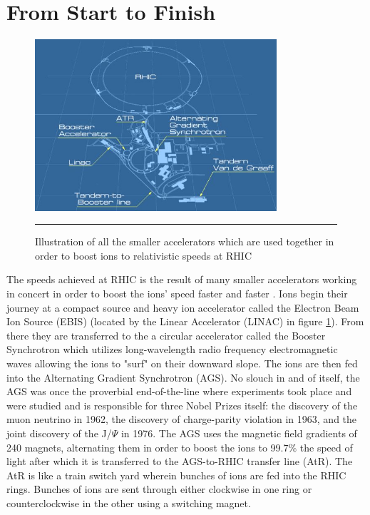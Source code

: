 \section{From Start to Finish}
\begin{figure}[htbp]
  \centering
    \includegraphics[width=0.8\textwidth]{Figures/RHICdiagram.JPG}
    \rule{35em}{0.5pt}
  \caption[Illustration of all the accelerators used to boost ions to relativistic speeds at RHIC]{Illustration of all the smaller accelerators which are used together in order to boost ions to relativistic speeds at RHIC}
  \label{fig:RHICdiagram}
\end{figure}
The speeds achieved at RHIC is the result of many smaller accelerators working in concert in order to boost the ions' speed faster and faster \citep{RHICaccel}.  Ions begin their journey at a compact source and heavy ion accelerator called the Electron Beam Ion Source (EBIS) (located by the Linear Accelerator (LINAC) in figure \ref{fig:RHICdiagram}). From there they are transferred to the a circular accelerator called the Booster Synchrotron which utilizes long-wavelength radio frequency electromagnetic waves allowing the ions to "surf" on their downward slope. The ions are then fed into the Alternating Gradient Synchrotron (AGS). No slouch in and of itself, the AGS was once the proverbial end-of-the-line where experiments took place and were studied and is responsible for three Nobel Prizes itself: the discovery of the muon neutrino in 1962, the discovery of charge-parity violation in 1963, and the joint discovery of the J/$\Psi$ in 1976. The AGS uses the magnetic field gradients of 240 magnets, alternating them in order to boost the ions to 99.7$\%$ the speed of light after which it is transferred to the AGS-to-RHIC transfer line (AtR). The AtR is like a train switch yard wherein bunches of ions are fed into the RHIC rings. Bunches of ions are sent through either clockwise in one ring or counterclockwise in the other using a switching magnet.

